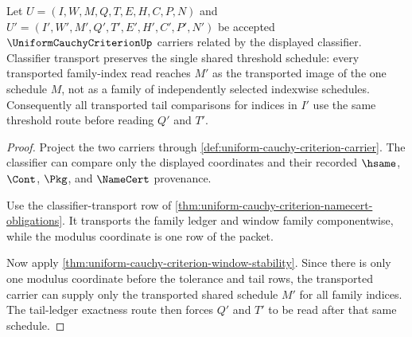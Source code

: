 \begin{theorem}
\label{thm:uniform-cauchy-criterion-shared-threshold-transport}
Let $U=(I,W,M,Q,T,E,H,C,P,N)$ and
$U'=(I',W',M',Q',T',E',H',C',P',N')$ be accepted
$\UniformCauchyCriterionUp$ carriers related by the displayed classifier.
Classifier transport preserves the single shared threshold schedule: every
transported family-index read reaches $M'$ as the transported image of the one
schedule $M$, not as a family of independently selected indexwise schedules.
Consequently all transported tail comparisons for indices in $I'$ use the same
threshold route before reading $Q'$ and $T'$.
\end{theorem}
\begin{proof}
Project the two carriers through
\autoref{def:uniform-cauchy-criterion-carrier}. The classifier can compare only
the displayed coordinates and their recorded $\hsame$, $\Cont$, $\Pkg$, and
$\NameCert$ provenance.

Use the classifier-transport row of
\autoref{thm:uniform-cauchy-criterion-namecert-obligations}. It transports the
family ledger and window family componentwise, while the modulus coordinate is
one row of the packet.

Now apply \autoref{thm:uniform-cauchy-criterion-window-stability}. Since there
is only one modulus coordinate before the tolerance and tail rows, the
transported carrier can supply only the transported shared schedule $M'$ for
all family indices. The tail-ledger exactness route then forces $Q'$ and $T'$
to be read after that same schedule.
\end{proof}

